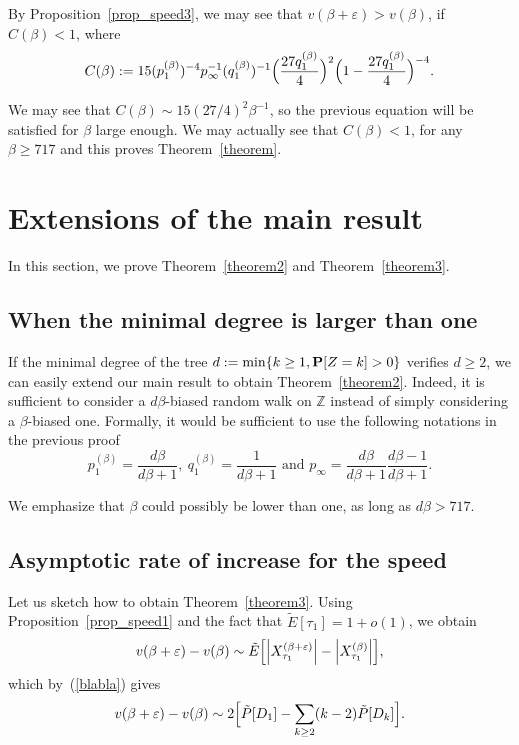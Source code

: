 \documentclass[12pt]{amsart}
\numberwithin{equation}{section}
\begin{document}
By Proposition~\ref{prop_speed3}, we may see that $v(\beta+{\varepsilon})>v(\beta)$, if $C(\beta)<1$, where
 \[
C(\beta):=15(p_1^{(\beta)})^{-4} p_{\infty}^{-1} (q_1^{(\beta)})^{-1} \Bigl(\frac{27 q_1^{(\beta)}}{4}\Bigr)^2 \Bigl(1-\frac{27 q_1^{(\beta)}}{4}\Bigr)^{-4}.
\]

We may see that $C(\beta)\sim 15(27/4)^2 \beta^{-1}$, so the previous equation will be satisfied for $\beta$ large enough. We may actually see that $C(\beta)<1$, for any $\beta\geq 717$ and this proves Theorem~\ref{theorem}.
 
 
 \section{Extensions of the main result}
 
 In this section, we prove Theorem~\ref{theorem2} and Theorem~\ref{theorem3}.
 
 \subsection{When the minimal degree is larger than one}
 
 If the minimal degree of the tree $d:=\min\{k\geq 1, {\bf P}[Z=k] >0\}$ verifies $d\geq 2$, we can easily extend our main result to obtain Theorem~\ref{theorem2}. Indeed, it is sufficient to consider a $d\beta$-biased random walk on ${\mathbb{Z}}$ instead of simply considering a $\beta$-biased one. Formally, it would be sufficient to use the following notations in the previous proof
 \[
 p_1^{(\beta)}=\frac{d\beta}{d\beta+1},\ q_1^{(\beta)}=\frac 1{d\beta+1} \text{ and } p_{\infty}= \frac{d\beta}{d\beta+1}\frac{d\beta-1}{d\beta+1}.
 \]
 
 We emphasize that $\beta$ could possibly be lower than one, as long as $d\beta>717$.
 
 \subsection{Asymptotic rate of increase for the speed}
 
 Let us sketch how to obtain Theorem~\ref{theorem3}. Using Proposition~\ref{prop_speed1} and the fact that $\tilde{E}[\tau_1]=1+o(1)$, we obtain
 \[
 v(\beta+{\varepsilon})-v(\beta)\sim\tilde{E}\Bigl[{\left\vert {X_{\tau_1}^{(\beta+{\varepsilon})}}\right\vert}-{\left\vert {X_{\tau_1}^{(\beta)}}\right\vert}\Bigr],
 \]
 which by~(\ref{blabla}) gives
 \[
 v(\beta+{\varepsilon})-v(\beta)\sim 2\Bigl[\tilde{P}[D_1]-\sum_{k\geq 2} (k-2) \tilde{P}[D_k]\Bigr].
 \]
 
\end{document}
